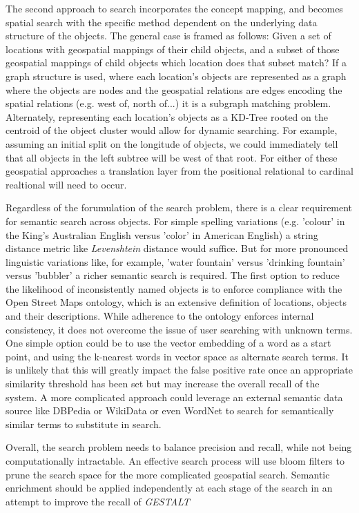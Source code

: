 The second approach to search incorporates the concept mapping, and becomes spatial search with the specific method dependent on the underlying data structure of the objects. 
The general case is framed as follows: Given a set of locations with geospatial mappings of their child objects, and a subset of those geospatial mappings of child objects which location does that subset match? 
If a graph structure is used, where each location's objects are represented as a graph where the objects are nodes and the geospatial relations are edges encoding the spatial relations (e.g. west of, north of...) it is a subgraph matching problem. 
Alternately, representing each location's objects as a KD-Tree rooted on the centroid of the object cluster would allow for dynamic searching. For example, assuming an initial split on the longitude of objects, we could immediately tell that all objects in the left subtree will be west of that root. 
For either of these geospatial approaches a translation layer from the positional relational to cardinal realtional will need to occur.

Regardless of the forumulation of the search problem, there is a clear requirement for semantic search across objects. For simple spelling variations (e.g. 'colour' in the King's Australian English versus 'color' in American English) a string distance metric like \textit{Levenshtein} distance would suffice. 
But for more pronounced linguistic variations like, for example, 'water fountain' versus 'drinking fountain' versus 'bubbler' a richer semantic search is required. 
The first option to reduce the likelihood of inconsistently named objects is to enforce compliance with the Open Street Maps ontology, which is an extensive definition of locations, objects and their descriptions. 
While adherence to the ontology enforces internal consistency, it does not overcome the issue of user searching with unknown terms. 
One simple option could be to use the vector embedding of a word as a start point, and using the k-nearest words in vector space as alternate search terms. 
It is unlikely that this will greatly impact the false positive rate once an appropriate similarity threshold has been set but may increase the overall recall of the system. 
A more complicated approach could leverage an external semantic data source like DBPedia or WikiData or even WordNet to search for semantically similar terms to substitute in search. 

Overall, the search problem needs to balance precision and recall, while not being computationally intractable. An effective search process will use bloom filters to prune the search space for the more complicated geospatial search. Semantic enrichment should be applied independently at each stage of the search in an attempt to improve the recall of \textit{GESTALT}

